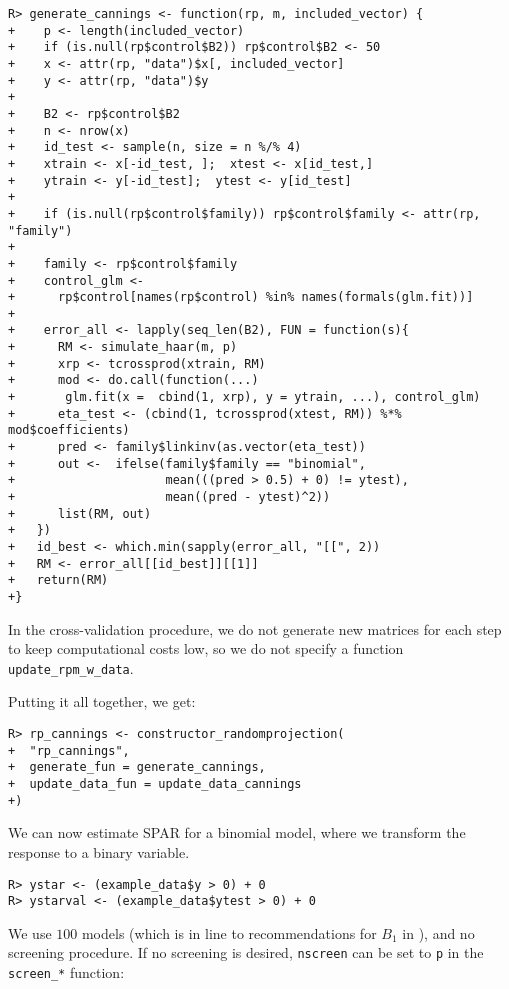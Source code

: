 \documentclass[
  article]{jss}
\begin{document}
\begin{verbatim}
R> generate_cannings <- function(rp, m, included_vector) {
+    p <- length(included_vector)
+    if (is.null(rp$control$B2)) rp$control$B2 <- 50
+    x <- attr(rp, "data")$x[, included_vector]
+    y <- attr(rp, "data")$y
+  
+    B2 <- rp$control$B2
+    n <- nrow(x)
+    id_test <- sample(n, size = n %/% 4)
+    xtrain <- x[-id_test, ];  xtest <- x[id_test,]
+    ytrain <- y[-id_test];  ytest <- y[id_test]
+  
+    if (is.null(rp$control$family)) rp$control$family <- attr(rp, "family")
+  
+    family <- rp$control$family
+    control_glm <-
+      rp$control[names(rp$control) %in% names(formals(glm.fit))]
+
+    error_all <- lapply(seq_len(B2), FUN = function(s){
+      RM <- simulate_haar(m, p)
+      xrp <- tcrossprod(xtrain, RM)
+      mod <- do.call(function(...) 
+       glm.fit(x =  cbind(1, xrp), y = ytrain, ...), control_glm)
+      eta_test <- (cbind(1, tcrossprod(xtest, RM)) %*% mod$coefficients)
+      pred <- family$linkinv(as.vector(eta_test))
+      out <-  ifelse(family$family == "binomial",
+                     mean(((pred > 0.5) + 0) != ytest), 
+                     mean((pred - ytest)^2))
+      list(RM, out)
+   })
+   id_best <- which.min(sapply(error_all, "[[", 2))
+   RM <- error_all[[id_best]][[1]]
+   return(RM)
+}
\end{verbatim}

In the cross-validation procedure, we do not generate new matrices for
each step to keep computational costs low, so we do not specify a
function \texttt{update\_rpm\_w\_data}.

Putting it all together, we get:

\begin{verbatim}
R> rp_cannings <- constructor_randomprojection(
+  "rp_cannings",
+  generate_fun = generate_cannings,
+  update_data_fun = update_data_cannings
+)
\end{verbatim}

We can now estimate SPAR for a binomial model, where we transform the
response to a binary variable.

\begin{verbatim}
R> ystar <- (example_data$y > 0) + 0
R> ystarval <- (example_data$ytest > 0) + 0
\end{verbatim}

We use \(100\) models (which is in line to recommendations for \(B_1\)
in \citet{cannings2017random}), and no screening procedure. If no
screening is desired, \texttt{nscreen} can be set to \texttt{p} in the
\texttt{screen\_*} function:
\end{document}
